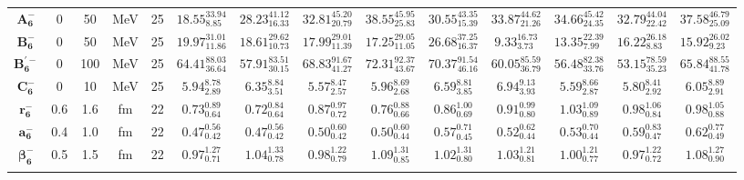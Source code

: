 \begin{tabular}{ c c c c c c c c c c c c c c}
$\mathbf{A_{6}^{-}}$ & 0 & 50 & MeV & 25 & $18.55^{33.94}_{8.85}$ & $28.23^{41.12}_{16.33}$ & $32.81^{45.20}_{20.79}$ & $38.55^{45.95}_{25.83}$ & $30.55^{43.35}_{15.39}$ & $33.87^{44.62}_{21.26}$ & $34.66^{45.42}_{24.35}$ & $32.79^{44.04}_{22.42}$ & $37.58^{46.79}_{25.09}$\\ 
$\mathbf{B_{6}^{-}}$ & 0 & 50 & MeV & 25 & $19.97^{31.01}_{11.86}$ & $18.61^{29.62}_{10.73}$ & $17.99^{29.01}_{11.39}$ & $17.25^{29.05}_{11.05}$ & $26.68^{37.25}_{16.37}$ & $9.33^{16.73}_{3.73}$ & $13.35^{22.39}_{7.99}$ & $16.22^{26.18}_{8.83}$ & $15.92^{26.02}_{9.23}$\\ 
$\mathbf{B_{6}^{'-}}$ & 0 & 100 & MeV & 25 & $64.41^{88.03}_{36.64}$ & $57.91^{83.51}_{30.15}$ & $68.83^{91.67}_{41.27}$ & $72.31^{92.37}_{43.67}$ & $70.37^{91.54}_{46.16}$ & $60.05^{85.59}_{36.79}$ & $56.48^{82.38}_{33.76}$ & $53.15^{78.59}_{35.23}$ & $65.84^{88.55}_{41.78}$\\ 
$\mathbf{C_{6}^{-}}$ & 0 & 10 & MeV & 25 & $5.94^{8.78}_{2.89}$ & $6.35^{8.84}_{3.51}$ & $5.57^{8.47}_{2.57}$ & $5.96^{8.69}_{2.68}$ & $6.59^{8.81}_{3.85}$ & $6.94^{9.13}_{3.93}$ & $5.59^{8.66}_{2.87}$ & $5.80^{8.41}_{2.92}$ & $6.05^{8.89}_{2.91}$\\ 
$\mathbf{r_{6}^{-}}$ & 0.6 & 1.6 & fm & 22 & $0.73^{0.89}_{0.64}$ & $0.72^{0.84}_{0.64}$ & $0.87^{0.97}_{0.72}$ & $0.76^{0.88}_{0.66}$ & $0.86^{1.00}_{0.69}$ & $0.91^{0.99}_{0.80}$ & $1.03^{1.09}_{0.89}$ & $0.98^{1.06}_{0.84}$ & $0.98^{1.05}_{0.88}$\\ 
$\mathbf{a_{6}^{-}}$ & 0.4 & 1.0 & fm & 22 & $0.47^{0.56}_{0.42}$ & $0.47^{0.56}_{0.42}$ & $0.50^{0.60}_{0.42}$ & $0.50^{0.60}_{0.44}$ & $0.57^{0.71}_{0.45}$ & $0.52^{0.62}_{0.44}$ & $0.53^{0.70}_{0.44}$ & $0.59^{0.83}_{0.47}$ & $0.62^{0.77}_{0.49}$\\ 
$\mathbf{\beta_{6}^{-}}$ & 0.5 & 1.5 & fm & 22 & $0.97^{1.27}_{0.71}$ & $1.04^{1.33}_{0.78}$ & $0.98^{1.22}_{0.79}$ & $1.09^{1.31}_{0.85}$ & $1.02^{1.31}_{0.80}$ & $1.03^{1.21}_{0.81}$ & $1.00^{1.21}_{0.77}$ & $0.97^{1.22}_{0.72}$ & $1.08^{1.27}_{0.90}$\\ 
\\ 
\end{tabular}
\egroup